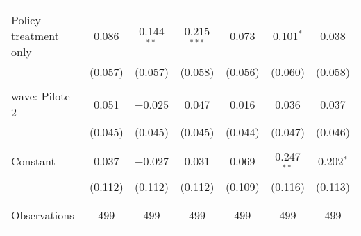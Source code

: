 \begin{tabular}{@{\extracolsep{5pt}}lcccccc}
  & & & & & & \\ 
 Policy treatment only & 0.086 & 0.144$^{**}$ & 0.215$^{***}$ & 0.073 & 0.101$^{*}$ & 0.038 \\ 
  & (0.057) & (0.057) & (0.058) & (0.056) & (0.060) & (0.058) \\ 
  & & & & & & \\ 
 wave: Pilote 2 & 0.051 & $-$0.025 & 0.047 & 0.016 & 0.036 & 0.037 \\ 
  & (0.045) & (0.045) & (0.045) & (0.044) & (0.047) & (0.046) \\ 
  & & & & & & \\ 
 Constant & 0.037 & $-$0.027 & 0.031 & 0.069 & 0.247$^{**}$ & 0.202$^{*}$ \\ 
  & (0.112) & (0.112) & (0.112) & (0.109) & (0.116) & (0.113) \\ 
  & & & & & & \\ 
\hline \\[-1.8ex] 

Observations & 499 & 499 & 499 & 499 & 499 & 499 \\ 
\hline 
\hline \\[-1.8ex] 
\end{tabular} 